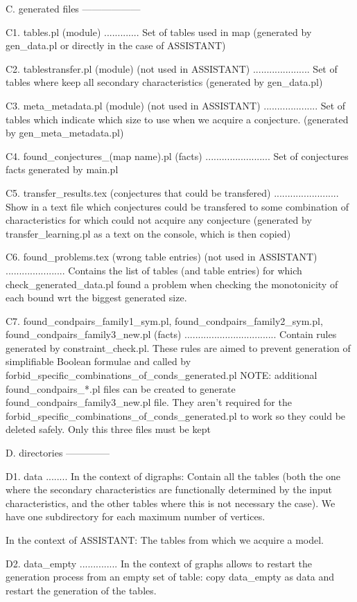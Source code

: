 C. generated files
------------------

C1. tables.pl            (module)
.............
 Set of tables used in map (generated by gen_data.pl or directly in the case of ASSISTANT)


C2. tablestransfer.pl    (module) (not used in ASSISTANT)
.....................
 Set of tables where keep all secondary characteristics (generated by gen_data.pl)


C3. meta_metadata.pl     (module) (not used in ASSISTANT)
....................
 Set of tables which indicate which size to use
 when we acquire a conjecture.  (generated by gen_meta_metadata.pl)


C4. found_conjectures_(map name).pl (facts)
........................
 Set of conjectures facts generated by main.pl


C5. transfer_results.tex (conjectures that could be transfered)
........................
 Show in a text file which conjectures could be transfered
 to some combination of characteristics for which could not
 acquire any conjecture (generated by transfer_learning.pl
 as a text on the console, which is then copied)


C6. found_problems.tex   (wrong table entries)  (not used in ASSISTANT)
......................
 Contains the list of tables (and table entries) for which 
 check_generated_data.pl found a problem when checking the
 monotonicity of each bound wrt the biggest generated size.
 
C7. found_condpairs_family1_sym.pl,
    found_condpairs_family2_sym.pl,
    found_condpairs_family3_new.pl   (facts)
..................................
 Contain rules generated by constraint_check.pl. These rules
 are aimed to prevent generation of simplifiable Boolean
 formulae and called by forbid_specific_combinations_of_conds_generated.pl
 NOTE: additional found_condpairs_*.pl files can be created to generate
 found_condpairs_family3_new.pl file. They aren't required for the
 forbid_specific_combinations_of_conds_generated.pl to work so they could be
 deleted safely. Only this three files must be kept


D. directories
--------------

D1. data
........
In the context of digraphs:
Contain all the tables (both the one where the secondary characteristics are functionally determined by the input characteristics, and the other tables where this is not necessary the case). We have one subdirectory for each maximum number of vertices.

In the context of ASSISTANT:
The tables from which we acquire a model.

D2. data_empty
..............
In the context of graphs allows to restart the generation process from an empty set of table: copy data_empty as data and restart the generation of the tables.
